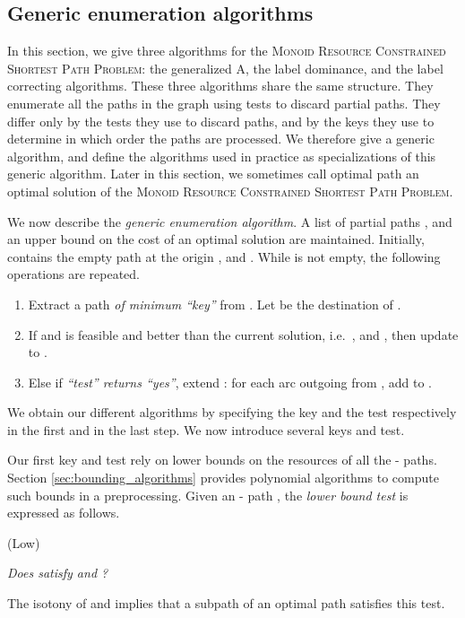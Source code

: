 \documentclass[11pt]{amsart}
\theoremstyle{plain}
\theoremstyle{remark}
\newcommand{\MRCSP}{\textsc{Monoid Resource Constrained Shortest Path Problem}\xspace}
\begin{document}
\subsection{Generic enumeration algorithms} \label{sub:generic_enumeration_algorithms}
In this section, we give three algorithms for the \MRCSP: the generalized A, the label dominance, and the label correcting algorithms. These three algorithms share the same structure. They enumerate all the paths in the graph using tests to discard partial paths. They differ only by the tests they use to discard paths, and by the keys they use to determine in which order the paths are processed. We therefore give a generic algorithm, and define the algorithms used in practice as specializations of this generic algorithm. Later in this section, we sometimes call optimal path an optimal solution of the \MRCSP.

We now describe the \emph{generic enumeration algorithm}. A list  of partial paths , and an upper bound  on the cost of an optimal solution are maintained. Initially,  contains the empty path at the origin , and . While  is not empty, the following operations are repeated.

\begin{enumerate}
	\item Extract a path  \emph{of minimum ``key''} from . Let  be the destination of . \label{step:key}
	\item If  and  is feasible and better than the current solution, i.e.~, and , then update  to .
	\item Else if \emph{``test'' returns ``yes''}, extend : for each arc  outgoing from , add  to . \label{step:test}
\end{enumerate}

We obtain our different algorithms by specifying the key and the test respectively in the first and in the last step. We now introduce several keys and test. 

Our first key and test rely on lower bounds  on the resources of all the - paths. Section \ref{sec:bounding_algorithms} provides polynomial algorithms to compute such bounds in a preprocessing. Given an - path , the \emph{lower bound test} is expressed as follows.


\smallskip
	(Low) \begin{minipage}{\dimexpr\textwidth-2cm} \emph{Does  satisfy  and ?}
\end{minipage}
\smallskip

\noindent The isotony of  and  implies that a subpath  of an optimal path satisfies this test. 
\end{document}
